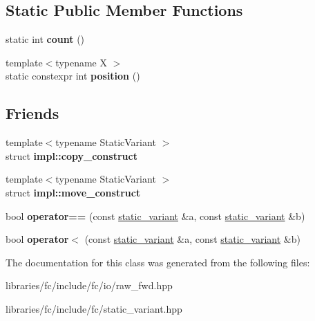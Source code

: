 \subsection*{Static Public Member Functions}
\begin{DoxyCompactItemize}
\item 
\mbox{\label{classfc_1_1static__variant_ac39cecf7a35f745bd6a63748ed41c10a}} 
static int {\bfseries count} ()
\item 
\mbox{\label{classfc_1_1static__variant_a46d17e082132818e81ae2dc8a812796b}} 
{\footnotesize template$<$typename X $>$ }\\static constexpr int {\bfseries position} ()
\end{DoxyCompactItemize}
\subsection*{Friends}
\begin{DoxyCompactItemize}
\item 
\mbox{\label{classfc_1_1static__variant_a6010df8092a905016b6bf328ef0b2274}} 
{\footnotesize template$<$typename Static\+Variant $>$ }\\struct {\bfseries impl\+::copy\+\_\+construct}
\item 
\mbox{\label{classfc_1_1static__variant_ae3385fa2f5b46bf5d07c0024550bdf75}} 
{\footnotesize template$<$typename Static\+Variant $>$ }\\struct {\bfseries impl\+::move\+\_\+construct}
\item 
\mbox{\label{classfc_1_1static__variant_a4f8bf4c32a2bf2ce7c91a81a1fcd3b8c}} 
bool {\bfseries operator==} (const \mbox{\hyperlink{classfc_1_1static__variant}{static\+\_\+variant}} \&a, const \mbox{\hyperlink{classfc_1_1static__variant}{static\+\_\+variant}} \&b)
\item 
\mbox{\label{classfc_1_1static__variant_a7930994fcdde21ebc7429a20aff0ffb0}} 
bool {\bfseries operator$<$} (const \mbox{\hyperlink{classfc_1_1static__variant}{static\+\_\+variant}} \&a, const \mbox{\hyperlink{classfc_1_1static__variant}{static\+\_\+variant}} \&b)
\end{DoxyCompactItemize}


The documentation for this class was generated from the following files\+:\begin{DoxyCompactItemize}
\item 
libraries/fc/include/fc/io/raw\+\_\+fwd.\+hpp\item 
libraries/fc/include/fc/static\+\_\+variant.\+hpp\end{DoxyCompactItemize}
